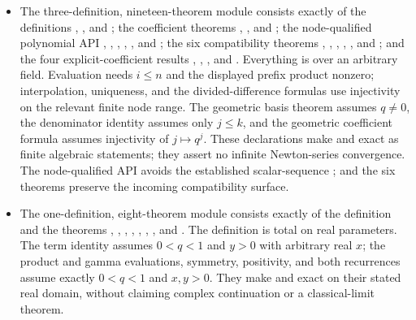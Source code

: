 \documentclass[11pt,a4paper,oneside,openany]{book}
\theoremstyle{definition}
\theoremstyle{remark}
\begin{document}
\begin{itemize}
\item The three-definition, nineteen-theorem module
 consists exactly of the definitions
, , and
; the coefficient theorems
, , and
; the node-qualified polynomial API
, ,
,
,
, and
; the six compatibility theorems
, ,
,
,
, and
; and the four explicit-coefficient results
, ,
, and
.  Everything is over an arbitrary
field.  Evaluation needs $i\le n$ and the displayed prefix product nonzero;
interpolation, uniqueness, and the divided-difference formulas use
injectivity on the relevant finite node range.  The geometric basis theorem
assumes $q\ne0$, the denominator identity assumes only $j\le k$, and the
geometric coefficient formula assumes injectivity of $j\mapsto q^j$.
These declarations make  and
 exact as finite algebraic statements; they
assert no infinite Newton-series convergence.  The node-qualified API avoids
the established scalar-sequence ;
 and the six  theorems preserve the
incoming compatibility surface.

\item The one-definition, eight-theorem module 
consists exactly of the definition  and the theorems
, ,
, ,
, ,
, and
.  The definition is total on real
parameters.  The term identity assumes $0<q<1$ and $y>0$ with arbitrary
real $x$; the product and gamma evaluations, symmetry, positivity, and both
recurrences assume exactly $0<q<1$ and $x,y>0$.  They make
 and  exact on their stated real
domain, without claiming complex continuation or a classical-limit theorem.


\end{itemize}
\end{document}
